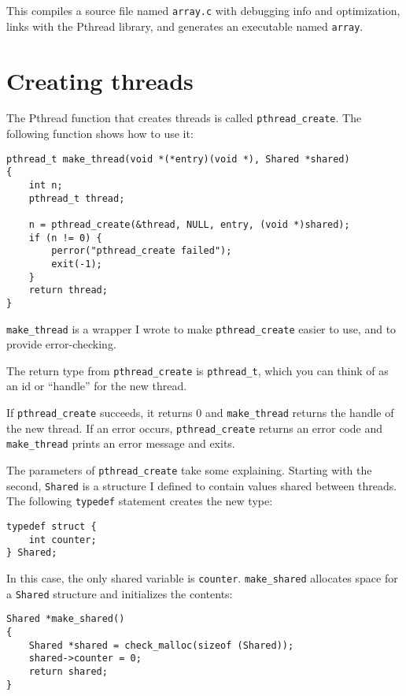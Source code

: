 \documentclass[12pt]{book}
\begin{document}
This compiles a source file named {\tt array.c} with debugging info
and optimization, links with the Pthread library, and generates an
executable named {\tt array}.


\section{Creating threads}

The Pthread function that creates threads is called \verb"pthread_create".
The following function shows how to use it:

\begin{verbatim}
pthread_t make_thread(void *(*entry)(void *), Shared *shared)
{
    int n;
    pthread_t thread;

    n = pthread_create(&thread, NULL, entry, (void *)shared);
    if (n != 0) {
        perror("pthread_create failed");
        exit(-1);
    }
    return thread;
}
\end{verbatim}

\verb"make_thread" is a wrapper I wrote to make
\verb"pthread_create" easier to use, and to provide error-checking.


The return type from \verb"pthread_create" is \verb"pthread_t",
which you can think of as an id or ``handle'' for the new thread.  

If {\tt pthread\_create} succeeds, it returns 0 and \verb"make_thread"
returns the handle of the new thread.
If an error occurs, {\tt pthread\_create} 
returns an error code and \verb"make_thread" prints an error message
and exits.

The parameters of {\tt pthread\_create} take some
explaining.  Starting with the second, {\tt Shared}
is a structure I defined to contain values shared between threads.
The following {\tt typedef} statement creates the new type:

\begin{verbatim}
typedef struct {
    int counter;
} Shared;
\end{verbatim}

In this case, the only shared variable is {\tt counter}.
{\tt make\_shared} allocates
space for a {\tt Shared} structure and initializes the contents:

\begin{verbatim}
Shared *make_shared()
{
    Shared *shared = check_malloc(sizeof (Shared));
    shared->counter = 0;
    return shared;
}
\end{verbatim}
\end{document}
